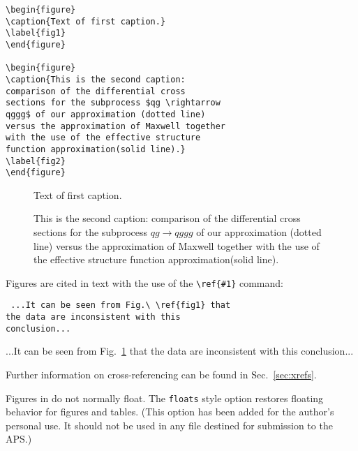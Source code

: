 \begin{verbatim}
\begin{figure}
\caption{Text of first caption.}
\label{fig1}
\end{figure}

\begin{figure}
\caption{This is the second caption:
comparison of the differential cross
sections for the subprocess $qg \rightarrow
qggg$ of our approximation (dotted line)
versus the approximation of Maxwell together
with the use of the effective structure
function approximation(solid line).}
\label{fig2}
\end{figure}

\end{verbatim}


\begin{figure}
\caption{Text of first caption.}
\label{fig1}
\end{figure}

\begin{figure}
\caption{This is the second caption:
comparison of the differential cross sections
for the subprocess $qg \rightarrow qggg$ of our
approximation (dotted line) versus the
approximation of Maxwell together with the use
of the effective structure function
approximation(solid line).}
\label{fig2}
\end{figure}


\bigskip

Figures are cited in text with the use of  the \verb+\ref{#1}+ command:

\smallskip

\begin{verbatim}
 ...It can be seen from Fig.\ \ref{fig1} that
the data are inconsistent with this
conclusion...
\end{verbatim}


\bigskip

 ...It can be seen from Fig.\ \ref{fig1} that
the data are inconsistent with this conclusion...

\bigskip

\noindent
Further information on cross-referencing can be found in
Sec.~\ref{sec:xrefs}.

Figures in \REVTeX{} do not normally float. The \verb+floats+ style option
restores floating behavior for figures and tables. (This option has been
added for the author's personal use. It should not be used in any file
destined for submission to the APS.)

